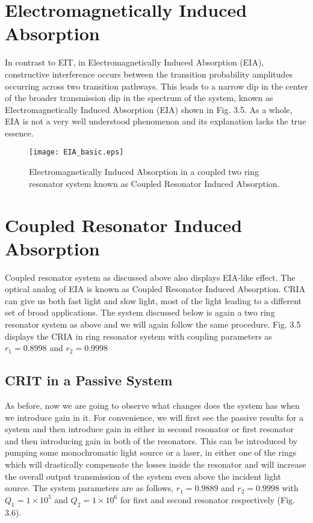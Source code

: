 \section{Electromagnetically Induced Absorption}
In contrast to EIT, in Electromagnetically Induced Absorption (EIA), constructive interference occurs between the transition probability amplitudes occurring across two transition pathways. This leads to a narrow dip in the center of the broader transmission dip in the spectrum of the system, known as Electromagnetically Induced Absorption (EIA) shown in Fig. 3.5. As a whole, EIA is not a very well understood phenomenon and its explanation lacks the true essence.

\begin{figure}[h]
\centering
\texttt{[image: EIA\_basic.eps]}
\caption{Electromagnetically Induced Absorption in a coupled two ring resonator system known as Coupled Resonator Induced Absorption.}
\end{figure}

\section{Coupled Resonator Induced Absorption} 
 
Coupled resonator system as discussed above also displays EIA-like effect. The optical analog of EIA is known as Coupled Resonator Induced Absorption. CRIA can give us both fast light and slow light, most of the light leading to a different set of broad applications. The system discussed below is again a two ring resonator system as above and we will again follow the same procedure. Fig. 3.5 displays the CRIA in ring resonator system with coupling parameters as $r_{1} = 0.8998$ and $r_{2} = 0.9998$


\subsection{CRIT in a Passive System}
As before, now we are going to observe what changes does the system has when we introduce gain in it. For convenience, we will first see the passive results for a system and then introduce gain in either in second resonator or first resonator and then introducing gain in both of the resonators. This can be introduced by pumping some monochromatic light source or a laser, in either one of the rings which will drastically compensate the losses inside the resonator and will increase the overall output transmission of the system even above the incident light source. The system parameters are as follows, $r_{1} = 0.9889$ and $r_{2} = 0.9998$ with $Q_{1} = 1\times10^{5}$ and $Q_{2} = 1\times10^{6}$ for first and second resonator respectively (Fig. 3.6). 

